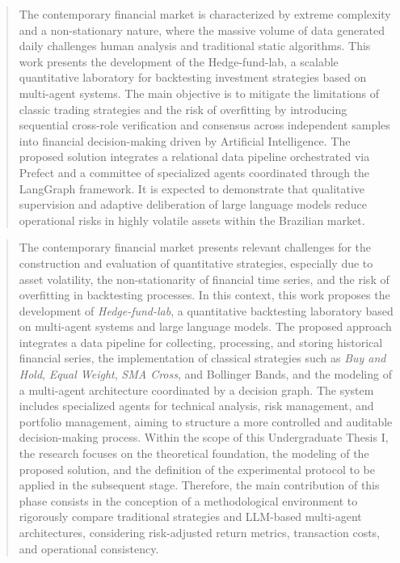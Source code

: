 \documentclass{eic-bcc-tcc}
\begin{document}
\begin{abstract}
The contemporary financial market is characterized by extreme complexity and a non-stationary nature, where the massive volume of data generated daily challenges human analysis and traditional static algorithms. This work presents the development of the Hedge-fund-lab, a scalable quantitative laboratory for backtesting investment strategies based on multi-agent systems. The main objective is to mitigate the limitations of classic trading strategies and the risk of overfitting by introducing sequential cross-role verification and consensus across independent samples into financial decision-making driven by Artificial Intelligence. The proposed solution integrates a relational data pipeline orchestrated via Prefect and a committee of specialized agents coordinated through the LangGraph framework. It is expected to demonstrate that qualitative supervision and adaptive deliberation of large language models reduce operational risks in highly volatile assets within the Brazilian market.
\end{abstract}
\begin{abstract}
The contemporary financial market presents relevant challenges for the construction and evaluation of quantitative strategies, especially due to asset volatility, the non-stationarity of financial time series, and the risk of overfitting in backtesting processes. In this context, this work proposes the development of \textit{Hedge-fund-lab}, a quantitative backtesting laboratory based on multi-agent systems and large language models. The proposed approach integrates a data pipeline for collecting, processing, and storing historical financial series, the implementation of classical strategies such as \textit{Buy and Hold}, \textit{Equal Weight}, \textit{SMA Cross}, and Bollinger Bands, and the modeling of a multi-agent architecture coordinated by a decision graph. The system includes specialized agents for technical analysis, risk management, and portfolio management, aiming to structure a more controlled and auditable decision-making process. Within the scope of this Undergraduate Thesis I, the research focuses on the theoretical foundation, the modeling of the proposed solution, and the definition of the experimental protocol to be applied in the subsequent stage. Therefore, the main contribution of this phase consists in the conception of a methodological environment to rigorously compare traditional strategies and LLM-based multi-agent architectures, considering risk-adjusted return metrics, transaction costs, and operational consistency.

\end{abstract}
\end{document}
